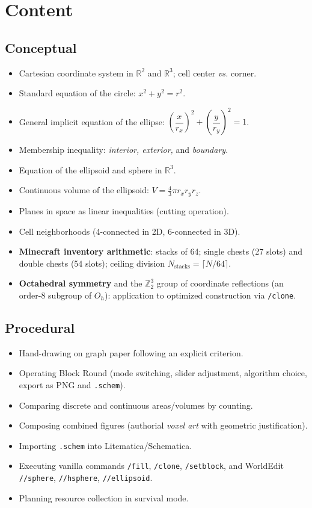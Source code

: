 \documentclass[12pt,a4paper]{scrartcl}
\newcommand{\acc}[1]{\textcolor{accent}{\textbf{#1}}}
\newcommand{\cmd}[1]{\textcolor{earth}{\texttt{\small #1}}}
\begin{document}
\section{Content}\label{sec:content}

\subsection{Conceptual}
\begin{itemize}[leftmargin=1.3em,itemsep=0.15em,topsep=0.3em]
  \item Cartesian coordinate system in $\mathbb{R}^2$ and $\mathbb{R}^3$; cell center \emph{vs.} corner.
  \item Standard equation of the circle: $x^2 + y^2 = r^2$.
  \item General implicit equation of the ellipse: $\left(\dfrac{x}{r_x}\right)^{\!2} + \left(\dfrac{y}{r_y}\right)^{\!2} = 1$.
  \item Membership inequality: \emph{interior, exterior,} and \emph{boundary}.
  \item Equation of the ellipsoid and sphere in $\mathbb{R}^3$.
  \item Continuous volume of the ellipsoid: $V = \tfrac{4}{3}\pi r_x r_y r_z$.
  \item Planes in space as linear inequalities (cutting operation).
  \item Cell neighborhoods (4-connected in 2D, 6-connected in 3D).
  \item \acc{Minecraft inventory arithmetic}: stacks of 64; single chests (27 slots) and double chests (54 slots); ceiling division $N_{\mathrm{stacks}} = \lceil N/64 \rceil$.
  \item \acc{Octahedral symmetry} and the $\mathbb{Z}_2^3$ group of coordinate reflections (an order-8 subgroup of $O_h$): application to optimized construction via \cmd{/clone}.
\end{itemize}

\subsection{Procedural}
\begin{itemize}[leftmargin=1.3em,itemsep=0.15em,topsep=0.3em]
  \item Hand-drawing on graph paper following an explicit criterion.
  \item Operating Block Round (mode switching, slider adjustment, algorithm choice, export as PNG and \texttt{.schem}).
  \item Comparing discrete and continuous areas/volumes by counting.
  \item Composing combined figures (authorial \emph{voxel art} with geometric justification).
  \item Importing \texttt{.schem} into Litematica/Schematica.
  \item Executing vanilla commands \cmd{/fill}, \cmd{/clone}, \cmd{/setblock}, and WorldEdit \cmd{//sphere}, \cmd{//hsphere}, \cmd{//ellipsoid}.
  \item Planning resource collection in survival mode.
\end{itemize}
\end{document}
